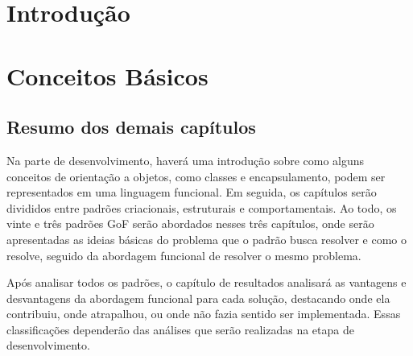 \documentclass[
	12pt,				%
	openright,			%
	twoside,			%
	a4paper,			%
	english,			%
	french,				%
	spanish,			%
	brazil				%
	]{abntex2}
\begin{document}

\frenchspacing 




\part{Introdução}

%




\part{Conceitos Básicos}









\chapter{Resumo dos demais capítulos}

Na parte de desenvolvimento, haverá uma introdução 
sobre como alguns conceitos de orientação a objetos, 
como classes e encapsulamento, podem ser representados 
em uma 
linguagem funcional. Em seguida, os capítulos serão 
divididos entre padrões criacionais, estruturais e 
comportamentais. Ao todo, os vinte e três padrões 
GoF serão abordados nesses três capítulos, onde serão 
apresentadas as ideias básicas do problema que o padrão 
busca resolver e como o resolve, seguido da abordagem 
funcional de resolver o mesmo problema.

Após analisar todos os padrões, o capítulo de resultados 
analisará as vantagens e desvantagens da abordagem 
funcional para cada solução, destacando onde ela 
contribuiu, onde atrapalhou, ou onde não fazia sentido ser 
implementada. Essas classificações dependerão das análises 
que serão realizadas na etapa de desenvolvimento.
\end{document}

